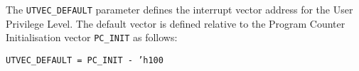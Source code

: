The \texttt{UTVEC\_DEFAULT} parameter defines the interrupt vector address for
the User Privilege Level. The default vector is defined relative to the
Program Counter Initialisation vector \texttt{PC\_INIT} as follows:

\texttt{UTVEC\_DEFAULT = PC\_INIT - 'h100}



